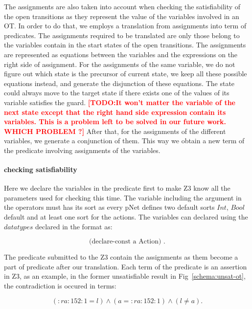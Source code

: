 \documentclass{lncs/llncs}
\newcommand{\TODO}[1]{\textcolor{red}{\textbf{[TODO:#1]}}}
\begin{document}
The assignments are also taken into account when checking the
satisfiability of the open transitions as they represent the value of
the variables involved in an OT. In order to do that, we employs a
translation from assignments into term of predicates. The assignments
required to be translated are only those belong to the variables
contain in the start states of the open transitions. The assignments
are represented as equations between the variables and the expressions
on the right side of assignment. For the assignments of the same
variable, we do not figure out which state is the precursor of current
state, we keep all these possible equations instead, and generate the
disjunction of these equations. The state could always move to the
target state if there exists one of the values of its variable
satisfies the guard.
\TODO{It won't matter the variable of the next state
except that the right hand side expression contain its variables. This
is a problem left to be solved in our future work. WHICH PROBLEM ?}
After that, for the assignments of the different variables, we generate a conjunction of them. This way we obtain a new term of the predicate involving assignments of the variables.


\paragraph{checking satisfiability}

Here we declare the variables in the predicate first to make Z3 know all the parameters used for checking this time. The variable including the argument in the operators must has its sort as every pNet defines two default sorts $Int$, $Bool$ default and at least one sort for the actions. The variables can declared using the $datatypes$ declared in the format as:

\[\text{(declare-const\ a\ Action) .}\]

The predicate submitted to the Z3 contain the assignments as them
become a part of predicate after our translation. Each term of the
predicate is an assertion in Z3, as an example, in the former
unsatisfiable result in Fig~\ref{schema:unsat-ot}, the contradiction is occured in terms: 

\[(:ra:152:1 = l) \land (a = :ra:152:1) \land (l \neq a) .\]
\end{document}
